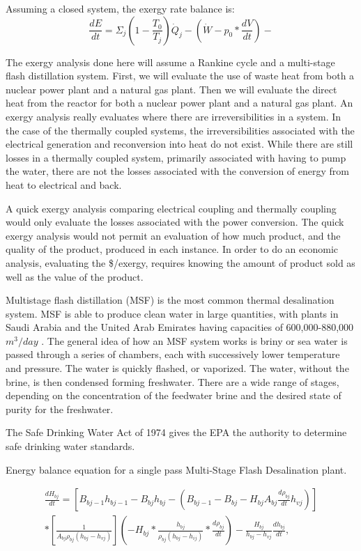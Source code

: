 \documentclass[12pt]{UIdahoMastersThesis}
\begin{document}
	Assuming a closed system, the exergy rate balance is:
\begin{equation}
\frac{dE}{dt}=\Sigma_j(1-\frac{T_0}{T_j})\dot{Q}_j-(\dot{W}-p_0*\frac{dV}{dt})-
\end{equation}

The exergy analysis done here will assume a Rankine cycle and a multi-stage flash distillation system.  First, we will evaluate the use of waste heat from both a nuclear power plant and a natural gas plant.  Then we will evaluate the direct heat from the reactor for both a nuclear power plant and a natural gas plant. An exergy analysis really evaluates where there are irreversibilities in a system.  In the case of the thermally coupled systems, the irreversibilities associated with the electrical generation and reconversion into heat do not exist.  While there are still losses in a thermally coupled system, primarily associated with having to pump the water, there are not the losses associated with the conversion of energy from heat to electrical and back.

A quick exergy analysis comparing electrical coupling and thermally coupling would only evaluate the losses associated with the power conversion.  The quick exergy analysis would not permit an evaluation of how much product, and the quality of the product, produced in each instance. In order to do an economic analysis, evaluating the \$/exergy, requires knowing the amount of product sold as well as the value of the product.

Multistage flash distillation (MSF) is the most common thermal desalination system.  MSF is able to produce clean water in large quantities, with plants in Saudi Arabia and the United Arab Emirates having capacities of 600,000-880,000 $m^3/day$ \cite{El-Dessouky2016}. The general idea of how an MSF system works is briny or sea water is passed through a series of chambers, each with successively lower temperature and pressure.  The water is quickly flashed, or vaporized.  The water, without the brine, is then condensed forming freshwater.  There are a wide range of stages, depending on the concentration of the feedwater brine and the desired state of purity for the freshwater.

The Safe Drinking Water Act of 1974 gives the EPA the authority to determine safe drinking water standards.

Energy balance equation for a single pass Multi-Stage Flash Desalination plant.

\begin{equation*}
\begin{aligned}
\frac{dH_{bj}}{dt}=[B_{bj-1}h_{bj-1}-B_{bj}h_{bj}-(B_{bj-1}-B_{bj}-H_{bj}A_{bj}\frac{d\rho_{bj}}{dt}h_{vj})]\\
*[\frac{1}{A_{bj}\rho_{bj}(h_{bj}-h_{vj})}] (-H_{bj}*\frac{h_{bj}}{\rho_{bj}(h_{bj}-h_{ij})}*\frac{d\rho_{bj}}{dt})-\frac{H_{bj}}{h_{bj}-h_{vj}}\frac{dh_{bj}}{dt}, 
\end{aligned}
\end{equation*}
\end{document}
